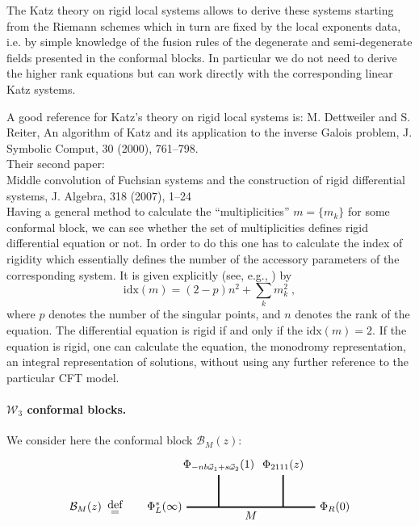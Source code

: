 \documentclass[12pt,a4paper]{article}
\newcommand\mydef{\stackrel{\mathclap{\normalfont\mbox{def}}}{=}}
\def\be{\begin{equation}}
\def\ee{\end{equation}}
\newcommand{\< }{{\langle}}
\renewcommand{\>}{{\rangle}}
\newcommand{\cB}{\mathcal{B}}
\newcommand{\cW}{\mathcal{W}}
\newcommand{\0}{\textbf{0.}}
\newcommand{\1}{\textbf{1.}}
\newcommand{\2}{\textbf{2.}}
\newcommand{\3}{\textbf{3.}}
\newcommand{\4}{\textbf{4.}}
\newcommand{\5}{\textbf{5.}}
\newcommand{\6}{\textbf{6.}}
\newcommand{\7}{\textbf{7.}}
\newcommand{\8}{\textbf{8.}}
\newcommand{\9}{\textbf{9.}}
\begin{document}
The Katz theory on rigid local systems allows to derive these systems starting from the Riemann schemes which in turn
are fixed by the local exponents data, i.e. by simple knowledge of the fusion rules of the degenerate and semi-degenerate 
fields presented in the conformal blocks. In particular we do not need to derive the higher rank equations but can work directly with the corresponding linear Katz systems. 

A good reference for Katz's theory on rigid local systems is:
M. Dettweiler and S. Reiter, An algorithm of Katz and its application to the inverse Galois problem,
J. Symbolic Comput, 30 (2000), 761--798.\\
Their second paper:\\
Middle convolution of Fuchsian systems and the construction of rigid differential systems,
J. Algebra, 318  (2007), 1--24\\


Having a general method to calculate the ``multiplicities'' $m=\{m_k\}$ for some conformal block,
we can see whether the set of multiplicities defines rigid differential equation or not.
In order to do this one has  to calculate the index of rigidity which essentially defines 
the number of the accessory parameters of the
corresponding system. It is given explicitly (see, e.g., \cite{oshima}) by
\be\label{indR}
\text{idx}(m) = (2 - p) n^2 + \sum_k m_k^2\;,
\ee
where $p$  denotes the number of the singular points, and  $n $ denotes the rank of the equation.
The differential equation is rigid if and only if  the $\text{idx}(m)   = 2$.
If the equation is rigid, one can calculate the equation, the monodromy representation,
an integral representation of solutions, without  using any further reference to the particular CFT model.



\paragraph{$\cW_3$ conformal blocks.}
 
 
We consider here the conformal block $\cB_M(z)$:
\begin{equation}
\label{cbconsidered}
\begin{tikzpicture}
[line width=1.2pt]
\draw (-2.5,0)node[left]{$\cB_M (z)$};
\draw (-2.5,0) node[right]{$\mydef$};
\draw (0,0)--(1,0);
\draw (1,0)--(1,1);
\draw (1,0)--(3,0);
\draw (3,0)--(3,1);
\draw (3,0)--(4,0);
\draw (0,0) node[left]{$\Phi^*_L (\infty)$};
\draw (1,1) node[above]{$\Phi_{- n b \vec{\omega}_1+s\vec{\omega}_2} (1)$};
\draw (3,1) node[above]{$\Phi_{2111} (z)$};
\draw (4,0) node[right]{$\Phi_R (0)$};
\draw (2,0) node[below]{$M$};
\end{tikzpicture}
\end{equation}
\end{document}
